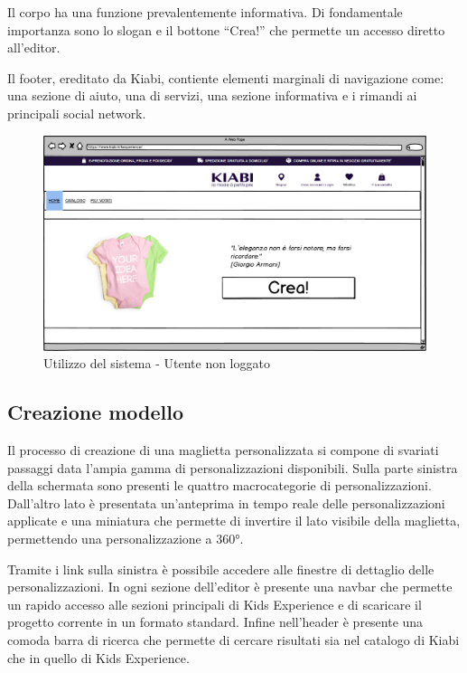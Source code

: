 \documentclass[12pt,italian,]{report}
\begin{document}
Il corpo ha una funzione prevalentemente informativa. Di fondamentale
importanza sono lo slogan e il bottone ``Crea!'' che permette un accesso
diretto all'editor.

Il footer, ereditato da Kiabi, contiente elementi marginali di
navigazione come: una sezione di aiuto, una di servizi, una sezione
informativa e i rimandi ai principali social network.

\begin{figure}[h]
\centering
\includegraphics{img/balsamiq/HomeSottositoUtenteEsterno.png}
\caption{Utilizzo del sistema - Utente non loggato}
\end{figure}

\hypertarget{creazione-modello}{%
\subsection{Creazione modello}\label{creazione-modello}}

Il processo di creazione di una maglietta personalizzata si compone di
svariati passaggi data l'ampia gamma di personalizzazioni disponibili.
Sulla parte sinistra della schermata sono presenti le quattro
macrocategorie di personalizzazioni. Dall'altro lato è presentata
un'anteprima in tempo reale delle personalizzazioni applicate e una
miniatura che permette di invertire il lato visibile della maglietta,
permettendo una personalizzazione a 360°.

Tramite i link sulla sinistra è possibile accedere alle finestre di
dettaglio delle personalizzazioni. In ogni sezione dell'editor è
presente una navbar che permette un rapido accesso alle sezioni
principali di Kids Experience e di scaricare il progetto corrente in un
formato standard. Infine nell'header è presente una comoda barra di
ricerca che permette di cercare risultati sia nel catalogo di Kiabi che
in quello di Kids Experience.
\end{document}
